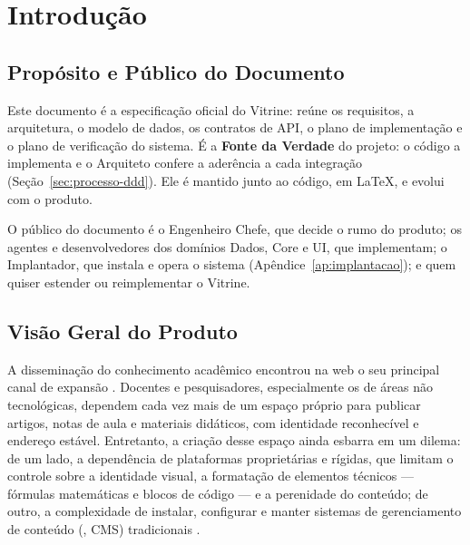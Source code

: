 \chapter{Introdução}\label{cap:intro}

\section{Propósito e Público do Documento}\label{sec:proposito}

Este documento é a especificação oficial do Vitrine: reúne os requisitos, a arquitetura, o modelo de dados, os contratos de API, o plano de implementação e o plano de verificação do sistema. É a \textbf{Fonte da Verdade} do projeto: o código a implementa e o Arquiteto confere a aderência a cada integração (Seção~\ref{sec:processo-ddd}). Ele é mantido junto ao código, em \LaTeX{}, e evolui com o produto.

O público do documento é o Engenheiro Chefe, que decide o rumo do produto; os agentes e desenvolvedores dos domínios Dados, Core e UI, que implementam; o Implantador, que instala e opera o sistema (Apêndice~\ref{ap:implantacao}); e quem quiser estender ou reimplementar o Vitrine.

\section{Visão Geral do Produto}\label{sec:visao-geral-produto}

A disseminação do conhecimento acadêmico encontrou na web o seu principal canal de expansão \cite{ginige2001web}. Docentes e pesquisadores, especialmente os de áreas não tecnológicas, dependem cada vez mais de um espaço próprio para publicar artigos, notas de aula e materiais didáticos, com identidade reconhecível e endereço estável. Entretanto, a criação desse espaço ainda esbarra em um dilema: de um lado, a dependência de plataformas proprietárias e rígidas, que limitam o controle sobre a identidade visual, a formatação de elementos técnicos --- fórmulas matemáticas e blocos de código --- e a perenidade do conteúdo; de outro, a complexidade de instalar, configurar e manter sistemas de gerenciamento de conteúdo (, CMS) tradicionais \cite{mikkonen2010mashware}.

